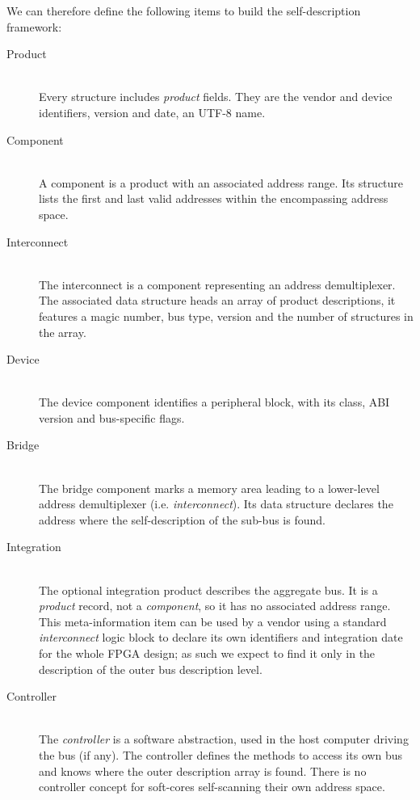 \documentclass[a4paper, 12pt]{article}
\begin{document}
We can therefore define the following items to build the
self-description framework:

\begin{description}
\item[Product] \hfill \\
Every structure includes \textit{product} fields. They are
the vendor and device identifiers, version and date, an UTF-8
name.

\item[Component] \hfill \\
A component is a product with an associated address range. Its
structure lists the first and last valid addresses within
the encompassing address space.

\item[Interconnect] \hfill \\
The interconnect is a component representing an address demultiplexer.
The associated data structure heads an array of product descriptions,
it features a magic number, bus type, version and the number of
structures in the array.

\item[Device] \hfill \\
The device component identifies a peripheral block, with
its class, ABI version and bus-specific flags.

\item[Bridge] \hfill \\
The bridge component marks a memory area leading to a lower-level
address demultiplexer (i.e. \textit{interconnect}). Its data
structure declares the address where the self-description of the
sub-bus is found.

\item[Integration] \hfill \\
The optional integration product describes the aggregate bus.
It is a \textit{product} record, not a
\textit{component}, so it has no associated address range. This
meta-information item can be used by a vendor using a standard
\textit{interconnect} logic block to declare its own
identifiers and integration date for the whole FPGA design; as
such we expect to find it only in the description of the
outer bus description level.

\item[Controller] \hfill \\
The \textit{controller} is a software abstraction, used in the host
computer driving the bus (if any). The controller defines the
methods to access its own bus and knows where the outer description
array is found.  There is no controller concept for soft-cores
self-scanning their own address space.

\end{description}
\end{document}
